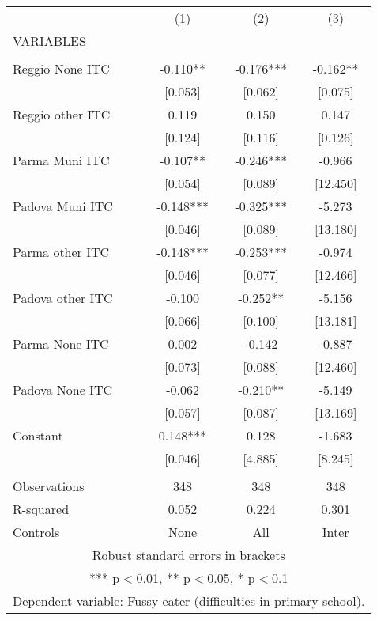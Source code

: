 \begin{tabular}{lccc} \hline
 & (1) & (2) & (3) \\
VARIABLES &  &  &  \\ \hline
 &  &  &  \\
Reggio None ITC & -0.110** & -0.176*** & -0.162** \\
 & [0.053] & [0.062] & [0.075] \\
Reggio other ITC & 0.119 & 0.150 & 0.147 \\
 & [0.124] & [0.116] & [0.126] \\
Parma Muni ITC & -0.107** & -0.246*** & -0.966 \\
 & [0.054] & [0.089] & [12.450] \\
Padova Muni ITC & -0.148*** & -0.325*** & -5.273 \\
 & [0.046] & [0.089] & [13.180] \\
Parma other ITC & -0.148*** & -0.253*** & -0.974 \\
 & [0.046] & [0.077] & [12.466] \\
Padova other ITC & -0.100 & -0.252** & -5.156 \\
 & [0.066] & [0.100] & [13.181] \\
Parma None ITC & 0.002 & -0.142 & -0.887 \\
 & [0.073] & [0.088] & [12.460] \\
Padova None ITC & -0.062 & -0.210** & -5.149 \\
 & [0.057] & [0.087] & [13.169] \\
Constant & 0.148*** & 0.128 & -1.683 \\
 & [0.046] & [4.885] & [8.245] \\
 &  &  &  \\
Observations & 348 & 348 & 348 \\
R-squared & 0.052 & 0.224 & 0.301 \\
 Controls & None & All & Inter \\ \hline
\multicolumn{4}{c}{ Robust standard errors in brackets} \\
\multicolumn{4}{c}{ *** p$<$0.01, ** p$<$0.05, * p$<$0.1} \\
\multicolumn{4}{c}{ Dependent variable: Fussy eater (difficulties in primary school).} \\
\end{tabular}
